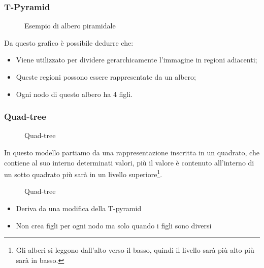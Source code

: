 \documentclass{report}
\begin{document}
\subsubsection{T-Pyramid}
\label{sec:treepy}
\begin{figure}[ht!]
  \centering
  \resizebox{15cm}{!}{
  }
  \caption{Esempio di albero piramidale}
  \label{fig:alberopir}
\end{figure}
Da questo grafico è possibile dedurre che:
\begin{itemize}
\item Viene utilizzato per dividere gerarchicamente l'immagine in regioni
  adiacenti;
\item Queste regioni possono essere rappresentate da un albero;
\item Ogni nodo di questo albero ha 4 figli.
\end{itemize}
\clearpage
\subsubsection{Quad-tree}
\label{sec:quad-tree}
\begin{figure}[ht!]
  \centering
  
  \caption{Quad-tree}
  \label{fig:qtree1}
\end{figure}
In questo modello partiamo da una rappresentazione inscritta in un
quadrato, che contiene al suo interno determinati valori, più il valore
è contenuto all'interno di un sotto quadrato più sarà in un livello
superiore\footnote{Gli alberi si leggono dall'alto verso il basso, quindi
  il livello sarà più alto più sarà in basso.}.
\begin{figure}[ht!]
  \centering
  
  \caption{Quad-tree}
  \label{fig:qtree2}
\end{figure}
\begin{itemize}
\item Deriva da una modiﬁca della T-pyramid
\item Non crea figli per ogni nodo ma solo quando i figli sono diversi
\end{itemize}
\end{document}
